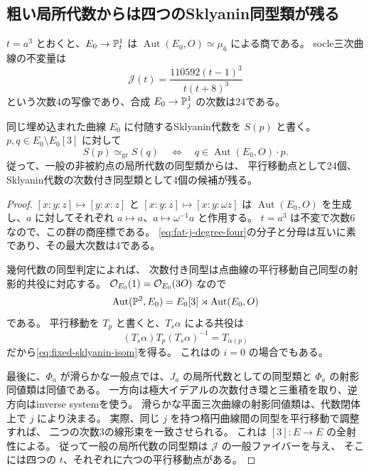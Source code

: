 \subsection{粗い局所代数からは四つのSklyanin同型類が残る}

\begin{theorem}[幾何学的一般点における有限多価の復元]\label{thm:four-sklyanin-classes}
$t=a^3$ とおくと、$E_0\to\mathbb P^1_t$ は
$\operatorname{Aut}(E_0,O)\simeq\mu_6$ による商である。
socle三次曲線の不変量は
\begin{equation}\label{eq:fat-j-degree-four}
 \mathcal J(t)=\frac{110592(t-1)^3}{t(t+8)^3}
\end{equation}
という次数4の写像であり、合成 $E_0\to\mathbb P^1_j$ の次数は24である。

同じ埋め込まれた曲線 $E_0$ に付随するSklyanin代数を $S(p)$ と書く。
$p,q\in E_0\setminus E_0[3]$ に対して
\begin{equation}\label{eq:fixed-sklyanin-isom}
 S(p)\simeq_{\mathrm{gr}}S(q)
 \quad\Longleftrightarrow\quad
 q\in\operatorname{Aut}(E_0,O)\cdot p.
\end{equation}
従って、一般の非被約点の局所代数の同型類からは、
平行移動点として24個、Sklyanin代数の次数付き同型類として4個の候補が残る。
\end{theorem}

\begin{proof}
$[x:y:z]\mapsto[y:x:z]$ と $[x:y:z]\mapsto[x:y:\omega z]$ は
$\operatorname{Aut}(E_0,O)$ を生成し、$a$ に対してそれぞれ
$a\mapsto a$、$a\mapsto\omega^{-1}a$ と作用する。
$t=a^3$ は不変で次数6なので、この群の商座標である。
\eqref{eq:fat-j-degree-four}の分子と分母は互いに素であり、その最大次数は4である。

幾何代数の同型判定\cite[Theorem 2.8]{IMRelations}によれば、
次数付き同型は点曲線の平行移動自己同型の射影的共役に対応する。
$\mathcal O_{E_0}(1)=\mathcal O_{E_0}(3O)$ なので
\[
 \operatorname{Aut}(\mathbb P^2,E_0)
 =E_0[3]\rtimes\operatorname{Aut}(E_0,O)
\]
である\cite[Theorem 4.12]{IMRelations}。
平行移動を $T_p$ と書くと、$T_s\alpha$ による共役は
\[
 (T_s\alpha)T_p(T_s\alpha)^{-1}=T_{\alpha(p)}
\]
だから\eqref{eq:fixed-sklyanin-isom}を得る。
これは\cite[Theorem 4.16 and Lemma 4.17]{IMRelations}の $i=0$ の場合でもある。

最後に、$\Phi_a$ が滑らかな一般点では、$J_a$ の局所代数としての同型類と
$\Phi_a$ の射影同値類は同値である。
一方向は極大イデアルの次数付き環と三重積を取り、逆方向はinverse systemを使う。
滑らかな平面三次曲線の射影同値類は、代数閉体上で $j$ により決まる。
実際、同じ $j$ を持つ楕円曲線間の同型を平行移動で調整すれば、
二つの次数3の線形束を一致させられる。
これは $[3]:E\to E$ の全射性による。
従って一般の局所代数の同型類は $\mathcal J$ の一般ファイバーを与え、
そこには四つの $t$、それぞれに六つの平行移動点がある。
\end{proof}

